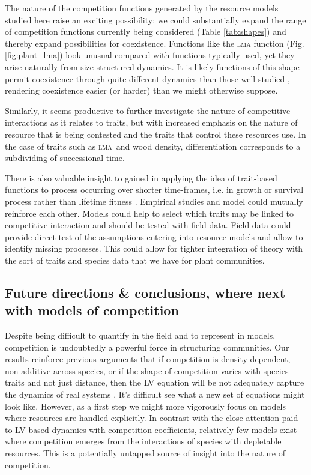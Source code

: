 \documentclass[a4paper,11pt]{article}
\newcommand{\lma}{\textsc{lma}}
\begin{document}
The nature of the competition functions generated by the resource models studied here raise an exciting possibility: we could substantially expand the range of competition functions currently being considered (Table \ref{tab:shapes}) and thereby expand possibilities for coexistence. Functions like the \textsc {lma} function
(Fig. \ref{fig:plant_lma}) look unusual compared with functions typically used, yet they arise naturally from size-structured dynamics.
It is likely functions of this shape permit coexistence through quite different dynamics than those well studied
\citep[e.g.][]{Leimar-2013}, rendering coexistence easier (or harder)
than we might otherwise suppose.

Similarly, it seems productive to further investigate the nature of competitive interactions as it relates to traits, but with increased emphasis on the nature of resource that is being contested and the traits that control these resources use. In the case of traits such as \lma\ and wood density, differentiation corresponds to a subdividing of successional time.

There is also valuable insight to gained in applying the idea of trait-based functions to process occurring over shorter time-frames, i.e. in growth or survival process rather than lifetime fitness
\citep[e.g.][]{Kunstler-2012, Lasky-2015, Kraft-2015}.
Empirical studies and model could mutually reinforce each other. Models could help to select which traits may be linked to competitive interaction and should be tested with field data. Field data could provide direct test of the assumptions entering into resource models and allow to identify missing processes. This could allow for tighter integration of theory with the sort of traits and species data that we have for plant communities.

\subsection{Future directions \& conclusions, where next with models of competition}

Despite being difficult to quantify in the field and to represent in models, competition is undoubtedly a powerful force in structuring communities. Our results reinforce previous arguments that if competition is density dependent, non-additive across species, or if the shape of competition varies with species traits and not just distance, then the
LV equation will be not adequately capture the dynamics of real systems \citep{Andrewartha-1953, Neill-1974, Abrams-1975,
  Wangersky-1978,Abrams-1980, Tilman-1987}.
It's difficult see what a new set of equations might look like.
However, as a first step we might more vigorously focus on models where resources are handled explicitly.
In contrast with the close attention paid to LV based dynamics with competition coefficients,
relatively few models exist where competition emerges from the interactions of species with depletable resources. This is a potentially untapped source of insight into the nature of competition.
\end{document}

